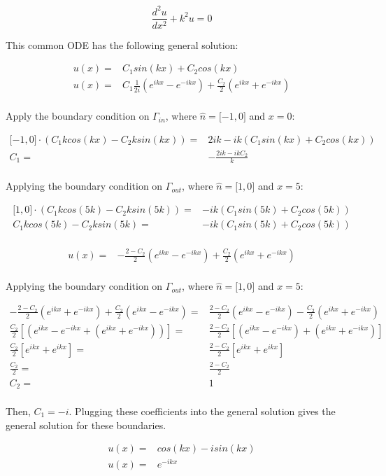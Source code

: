 \documentclass[10pt]{article}
\newcommand{\beq}{\begin{equation}}
\newcommand{\eeq}{\end{equation}}
\newcommand{\beqa}{\begin{equation}\begin{aligned}}
\newcommand{\eeqa}{\end{aligned}\end{equation}}
\begin{document}
\beq
\frac{d^2u}{dx^2}+k^2u=0
\eeq

This common ODE has the following general solution:

\beqa
u(x)=&C_1sin(kx)+C_2cos(kx)\\
u(x)=&C_1\frac{1}{2i}\left(e^{ikx}-e^{-ikx}\right)+\frac{C_2}{2}\left(e^{ikx}+e^{-ikx}\right)\\
\eeqa

Apply the boundary condition on \(\Gamma_{in}\), where \(\hat{n}=\lbrack -1, 0\rbrack\) and \(x=0\):

\beqa
\lbrack -1, 0\rbrack\cdot(C_1kcos(kx)-C_2ksin(kx))=&2ik-ik(C_1sin(kx)+C_2cos(kx))\\
C_1=&-\frac{2ik-ikC_2}{k}\\
\eeqa

Applying the boundary condition on \(\Gamma_{out}\), where \(\hat{n}=\lbrack 1, 0\rbrack\) and \(x=5\):

\beqa
\lbrack 1, 0\rbrack\cdot(C_1kcos(5k)-C_2ksin(5k))=&-ik(C_1sin(5k)+C_2cos(5k))\\
C_1kcos(5k)-C_2ksin(5k)=&-ik(C_1sin(5k)+C_2cos(5k))\\
\eeqa

\beqa
u(x)=&-\frac{2-C_2}{2}\left(e^{ikx}-e^{-ikx}\right)+\frac{C_2}{2}\left(e^{ikx}+e^{-ikx}\right)\\
\eeqa

Applying the boundary condition on \(\Gamma_{out}\), where \(\hat{n}=\lbrack 1, 0\rbrack\) and \(x=5\):

\beqa
-\frac{2-C_2}{2}\left(e^{ikx}+e^{-ikx}\right)+\frac{C_2}{2}\left(e^{ikx}-e^{-ikx}\right)=&\frac{2-C_2}{2}\left(e^{ikx}-e^{-ikx}\right)-\frac{C_2}{2}\left(e^{ikx}+e^{-ikx}\right)\\
\frac{C_2}{2}\left\lbrack\left(e^{ikx}-e^{-ikx}+\left(e^{ikx}+e^{-ikx}\right)\right)\right\rbrack=&\frac{2-C_2}{2}\left\lbrack\left(e^{ikx}-e^{-ikx}\right)+\left(e^{ikx}+e^{-ikx}\right)\right\rbrack\\
\frac{C_2}{2}\left\lbrack e^{ikx}+e^{ikx}\right\rbrack=&\frac{2-C_2}{2}\left\lbrack e^{ikx}+e^{ikx}\right\rbrack\\
\frac{C_2}{2}=&\frac{2-C_2}{2}\\
C_2=&1\\
\eeqa

Then, \(C_1=-i\). Plugging these coefficients into the general solution gives the general solution for these boundaries.

\beqa
u(x)=&cos(kx)-isin(kx)\\
u(x)=&e^{-ikx}\\
\eeqa
\end{document}

